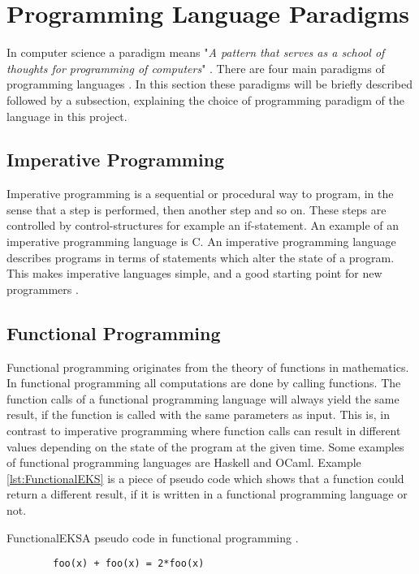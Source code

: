 \section{Programming Language Paradigms}
In computer science a paradigm means "\textit{A pattern that serves as a school of thoughts for programming of computers}" \citep{ProgrammingParadigms2}. 
There are four main paradigms of programming languages \citep{ProgrammingParadigms}. In this section these paradigms will be briefly described followed by a subsection, explaining the choice of programming paradigm of the language in this project.

\subsection{Imperative Programming}
Imperative programming is a sequential or procedural way to program, in the sense that a step is performed, then another step and so on. These steps are controlled by control-structures for example an if-statement. An example of an imperative programming language is C. An imperative programming language describes programs in terms of statements which alter the state of a program. This makes imperative languages simple, and a good starting point for new programmers \citep{ProgrammingParadigms}.

\subsection{Functional Programming}
Functional programming originates from the theory of functions in mathematics. In functional programming all computations are done by calling functions. The function calls of a functional programming language will always yield the same result, if the function is called with the same parameters as input. This is, in contrast to imperative programming where function calls can result in different values depending on the state of the program at the given time. Some examples of functional programming languages are Haskell and OCaml.
Example \ref{lst:FunctionalEKS} is a piece of pseudo code which shows that a function could return a different result, if it is written in a functional programming language or not.

\begin{code}{FunctionalEKS}{A pseudo code in functional programming \citep{funcprog}.}
	\begin{lstlisting}
		foo(x) + foo(x) = 2*foo(x)
	\end{lstlisting}
\end{code}

